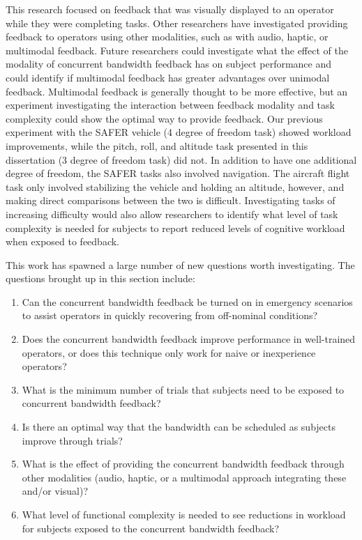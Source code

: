 This research focused on feedback that was visually displayed to an operator while they were completing tasks.
Other researchers have investigated providing feedback to operators using other modalities, such as with audio, haptic, or multimodal feedback.
Future researchers could investigate what the effect of the modality of concurrent bandwidth feedback has on subject performance and could identify if multimodal feedback has greater advantages over unimodal feedback.
Multimodal feedback is generally thought to be more effective, but an experiment investigating the interaction between feedback modality and task complexity could show the optimal way to provide feedback.
Our previous experiment with the SAFER vehicle (4 degree of freedom task) showed workload improvements, while the pitch, roll, and altitude task presented in this dissertation (3 degree of freedom task) did not.
In addition to have one additional degree of freedom, the SAFER tasks also involved navigation.
The aircraft flight task only involved stabilizing the vehicle and holding an altitude, however, and making direct comparisons between the two is difficult.
Investigating tasks of increasing difficulty would also allow researchers to identify what level of task complexity is needed for subjects to report reduced levels of cognitive workload when exposed to feedback.

This work has spawned a large number of new questions worth investigating.
The questions brought up in this section include:
\begin{enumerate}
    \item Can the concurrent bandwidth feedback be turned on in emergency scenarios to assist operators in quickly recovering from off-nominal conditions?
    \item Does the concurrent bandwidth feedback improve performance in well-trained operators, or does this technique only work for naive or inexperience operators?
    \item What is the minimum number of trials that subjects need to be exposed to concurrent bandwidth feedback?
    \item Is there an optimal way that the bandwidth can be scheduled as subjects improve through trials?
    \item What is the effect of providing the concurrent bandwidth feedback through other modalities (audio, haptic, or a multimodal approach integrating these and/or visual)?
    \item What level of functional complexity is needed to see reductions in workload for subjects exposed to the concurrent bandwidth feedback?
\end{enumerate}

